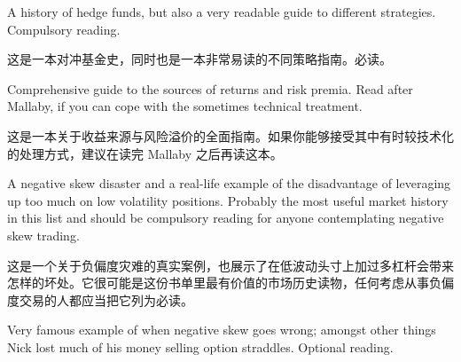 \begin{englishblock} A history of hedge funds, but also a very readable guide to different strategies. Compulsory reading. \end{englishblock}

\begin{chineseblock}这是一本对冲基金史，同时也是一本非常易读的不同策略指南。必读。\end{chineseblock}


\begin{englishblock} Comprehensive guide to the sources of returns and risk premia. Read after Mallaby, if you can cope with the sometimes technical treatment. \end{englishblock}

\begin{chineseblock}这是一本关于收益来源与风险溢价的全面指南。如果你能够接受其中有时较技术化的处理方式，建议在读完 Mallaby 之后再读这本。\end{chineseblock}


\begin{englishblock} A negative skew disaster and a real-life example of the disadvantage of leveraging up too much on low volatility positions. Probably the most useful market history in this list and should be compulsory reading for anyone contemplating negative skew trading. \end{englishblock}

\begin{chineseblock}这是一个关于负偏度灾难的真实案例，也展示了在低波动头寸上加过多杠杆会带来怎样的坏处。它很可能是这份书单里最有价值的市场历史读物，任何考虑从事负偏度交易的人都应当把它列为必读。\end{chineseblock}


\begin{englishblock} Very famous example of when negative skew goes wrong; amongst other things Nick lost much of his money selling option straddles. Optional reading. \end{englishblock}

